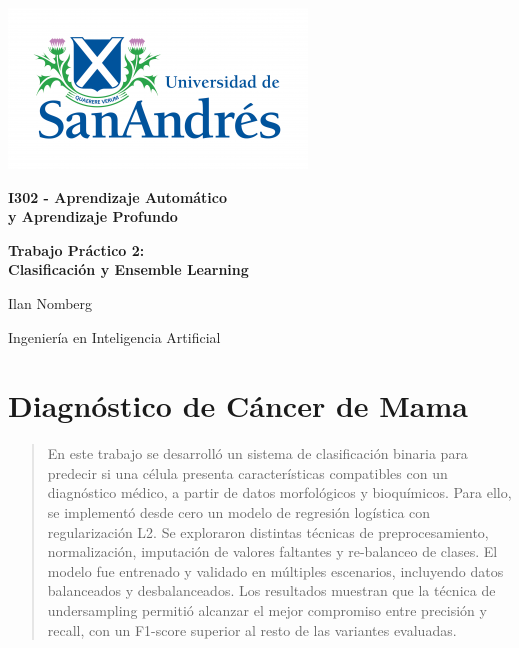 \documentclass[11pt]{article}
\begin{document}
\begin{titlepage}
    \centering
    \vspace*{2cm}
    \includegraphics[scale=1.8]{Logo-udesa.png}\par
    \vspace{10pt}

    {\LARGE \textbf{I302 - Aprendizaje Automático\\ y Aprendizaje Profundo}\par}
    \vspace{1cm}

    {\LARGE \textbf{Trabajo Práctico 2: \\Clasificación y Ensemble Learning}\par}
    \vspace{4cm}
    
    {\LARGE {Ilan Nomberg}\par {Ingeniería en Inteligencia Artificial}}  %
    \vspace{4cm}
    
    \vspace{1cm}
    \Large{}
    \date{}
\end{titlepage}

\section{Diagnóstico de Cáncer de Mama}
\begin{abstract}
    En este trabajo se desarrolló un sistema de clasificación binaria para predecir si una célula presenta características compatibles con un diagnóstico médico, a partir de datos morfológicos y bioquímicos. Para ello, se implementó desde cero un modelo de regresión logística con regularización L2. Se exploraron distintas técnicas de preprocesamiento, normalización, imputación de valores faltantes y re-balanceo de clases. El modelo fue entrenado y validado en múltiples escenarios, incluyendo datos balanceados y desbalanceados. Los resultados muestran que la técnica de undersampling permitió alcanzar el mejor compromiso entre precisión y recall, con un F1-score superior al resto de las variantes evaluadas.
\end{abstract}
    
\end{document}
